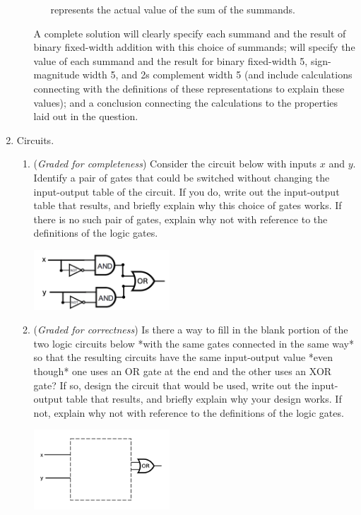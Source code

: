 \documentclass[12pt, oneside]{article}
\newcommand{\gradeCorrect}{({\it Graded for correctness}) }
\newcommand{\gradeComplete}{({\it Graded for completeness}) }
\begin{document}
\begin{enumerate}[labelindent=0pt, leftmargin=0pt]
\begin{enumerate}
\begin{itemize}
            represents the actual value of the sum of the summands.
            \end{itemize}
            A complete solution will clearly specify each summand and the result of binary fixed-width addition 
            with this choice of summands; will specify  the value of each summand and the result for 
            binary fixed-width 5, 
            sign-magnitude width 5, and 2s complement width 5 (and include calculations connecting with the 
            definitions of these representations to explain these values); and a conclusion connecting
            the calculations to the properties laid out in the question.
        \end{enumerate}    
        \item Circuits. 
        \begin{enumerate}
            \item\gradeComplete Consider the circuit below with inputs $x$ and $y$. 
            Identify a pair of gates that could 
            be switched without changing the input-output table of the circuit.
            If you do, write 
            out the input-output table that results, and briefly explain why 
            this choice of gates works. If there is no such pair of gates, 
            explain why not with reference to the definitions
            of the logic gates.            
        \begin{center}
            \includegraphics[width=2in]{../../files/circuits-hw3.png}
        \end{center}

        \item\gradeCorrect  Is there a way to fill in the blank portion of 
        the two logic circuits below *with the same gates connected in the same way*
        so that the resulting circuits have the same 
        input-output value *even though* one uses an OR gate at the end and the other 
        uses an XOR gate? If so, design the circuit that would be used, write 
        out the input-output table that results, and briefly explain why your 
        design works. If not, explain why not with reference to the definitions
        of the logic gates.
        \begin{multicols}{2}
            \begin{center}
                \includegraphics[width=2in]{../../files/circuit-blank-or-hw3.png}
            \end{center}
     

\end{multicols}
\end{enumerate}
\end{enumerate}
\end{document}
